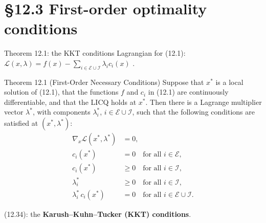\documentclass[aspectratio=169,12pt]{beamer}
\newcommand{\xs}{x^{*}}
\newcommand{\eqn}[1]{\text{\small(#1)}}
\newcommand{\ls}{\lambda^{*}}
\newcommand{\cE}{\mathcal{E}}
\newcommand{\cI}{\mathcal{I}}
\newcommand{\cL}{\mathcal{L}}
\begin{document}
\section{\S12.3 First-order optimality conditions}

\begin{frame}{Theorem 12.1: the KKT conditions}
  Lagrangian for (12.1):\quad
  $\cL(x,\lambda)=f(x)-\sum_{i\in\cE\cup\cI}\lambda_{i}c_{i}(x)$ \eqn{12.33}.
  \begin{block}{Theorem 12.1 (First-Order Necessary Conditions)}
    \small Suppose that $\xs$ is a local solution of (12.1), that the functions $f$ and $c_{i}$ in (12.1) are
    continuously differentiable, and that the LICQ holds at $\xs$. Then there is a Lagrange multiplier
    vector $\ls$, with components $\ls_{i}$, $i\in\cE\cup\cI$, such that the following conditions are
    satisfied at $(\xs,\ls)$:
    \vspace{-0.8em}
    \begin{align}
      \nabla_{x}\cL(\xs,\ls) &= 0, \tag{12.34a}\\[-0.35em]
      c_{i}(\xs) &= 0\quad\text{for all } i\in\cE, \tag{12.34b}\\[-0.35em]
      c_{i}(\xs) &\ge 0\quad\text{for all } i\in\cI, \tag{12.34c}\\[-0.35em]
      \ls_{i} &\ge 0\quad\text{for all } i\in\cI, \tag{12.34d}\\[-0.35em]
      \ls_{i}\,c_{i}(\xs) &= 0\quad\text{for all } i\in\cE\cup\cI. \tag{12.34e}
    \end{align}
  \end{block}
  (12.34): the \textbf{Karush--Kuhn--Tucker (KKT) conditions}.
\end{frame}
\end{document}
